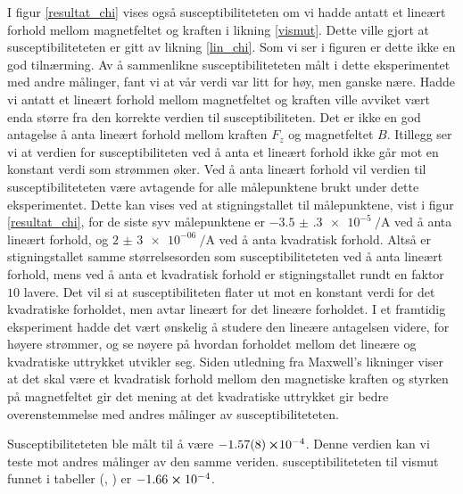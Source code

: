 \documentclass[%
 reprint,
 amsmath,amssymb,
 aps,
 norsk,
]{revtex4-1}
\begin{document}
I figur \vref{resultat_chi} vises også susceptibiliteteten om vi hadde antatt et lineært forhold mellom magnetfeltet og kraften i likning \eqref{vismut}. Dette ville gjort at susceptibiliteteten er gitt av likning \eqref{lin_chi}. Som vi ser i figuren er dette ikke en god tilnærming. Av å sammenlikne susceptibiliteteten målt i dette eksperimentet med andre målinger, fant vi at vår verdi var litt for høy, men ganske nære. Hadde vi antatt et lineært forhold mellom magnetfeltet og kraften ville avviket vært enda større fra den korrekte verdien til susceptibiliteten. Det er ikke en god antagelse å anta lineært forhold mellom kraften $F_z$ og magnetfeltet $B$. Itillegg ser vi at verdien for susceptibiliteten ved å anta et lineært forhold ikke går mot en konstant verdi som strømmen øker. Ved å anta lineært forhold vil verdien til susceptibiliteteten være avtagende for alle målepunktene brukt under dette eksperimentet. Dette kan vises ved at stigningstallet til målepunktene, vist i figur \vref{resultat_chi}, for de siste syv målepunktene er $\SI{-3.5(3)e-5}{\per\ampere}$ ved å anta lineært forhold, og $\SI{2(3)e-06}{\per\ampere}$ ved å anta kvadratisk forhold. Altså er stigningstallet samme størrelsesorden som susceptibiliteteten ved å anta lineært forhold, mens ved å anta et kvadratisk forhold er stigningstallet rundt en faktor $10$ lavere. Det vil si at susceptibiliteten flater ut mot en konstant verdi for det kvadratiske forholdet, men avtar lineært for det lineære forholdet.
I et framtidig eksperiment hadde det vært ønskelig å studere den lineære antagelsen videre, for høyere strømmer, og se nøyere på hvordan forholdet mellom det lineære og kvadratiske uttrykket utvikler seg. Siden utledning fra Maxwell's likninger viser at det skal være et kvadratisk forhold mellom den magnetiske kraften og styrken på magnetfeltet gir det mening at det kvadratiske uttrykket gir bedre overenstemmelse med andres målinger av susceptibiliteteten.
\par
Susceptibiliteteten ble målt til å være $-\SI{1.57\pm0.08}\cross 10^{-4}$. Denne verdien kan vi teste mot andres målinger av den samme veriden. susceptibiliteteten til vismut funnet i tabeller (\cite{noauthor_magnetic_nodate}, \cite{noauthor_magnetic_2018}) er $-1.66 \cross 10^{-4}$.
\end{document}
